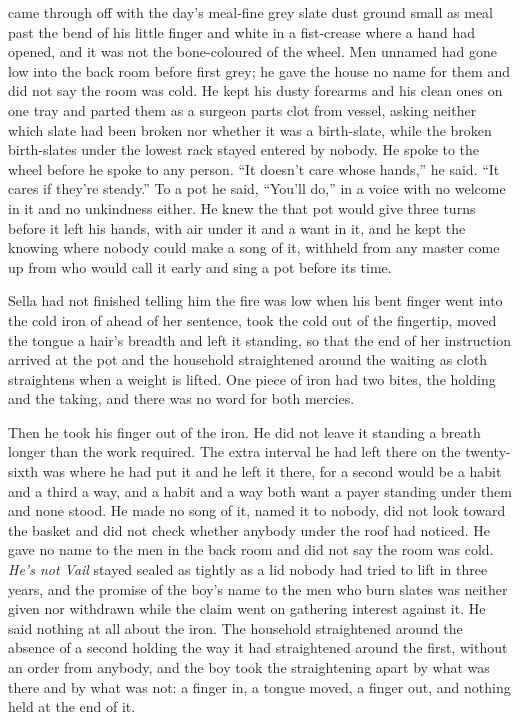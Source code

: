 \scenebreak

 came through  off  with the day's meal-fine grey slate dust ground small as meal past the bend of his little finger and white in a fist-crease where a hand had opened, and it was not the bone-coloured  of the wheel. Men unnamed had gone low into the back room before first grey; he gave the house no name for them and did not say the room was cold. He kept his dusty forearms and his clean ones on one tray and parted them as a surgeon parts clot from vessel, asking neither which slate had been broken nor whether it was a birth-slate, while the broken birth-slates under the lowest rack stayed entered by nobody. He spoke to the wheel before he spoke to any person. “It doesn't care whose hands,” he said. “It cares if they're steady.” To a pot he said, “You'll do,” in a voice with no welcome in it and no unkindness either. He knew the  that pot would give three turns before it left his hands, with air under it and a want in it, and he kept the knowing where nobody could make a song of it, withheld from any master come up from  who would call it early and sing a pot before its time.

Sella had not finished telling him the fire was low when his bent finger went into the cold iron of  ahead of her sentence, took the cold out of the fingertip, moved the tongue a hair's breadth and left it standing, so that the end of her instruction arrived at the pot and the household straightened around the waiting as cloth straightens when a weight is lifted. One piece of iron had two bites, the holding and the taking, and there was no  word for both mercies.

Then he took his finger out of the iron. He did not leave it standing a breath longer than the work required. The extra interval he had left there on the twenty-sixth was where he had put it and he left it there, for a second would be a habit and a third a way, and a habit and a way both want a payer standing under them and none stood. He made no song of it, named it to nobody, did not look toward the basket and did not check whether anybody under the roof had noticed. He gave no name to the men in the back room and did not say the room was cold. \emph{He's not Vail} stayed sealed as tightly as a lid nobody had tried to lift in three years, and the promise of the boy's name to the men who burn slates was neither given nor withdrawn while the claim went on gathering interest against it. He said nothing at all about the iron. The household straightened around the absence of a second holding the way it had straightened around the first, without an order from anybody, and the boy took the straightening apart by what was there and by what was not: a finger in, a tongue moved, a finger out, and nothing held at the end of it.

